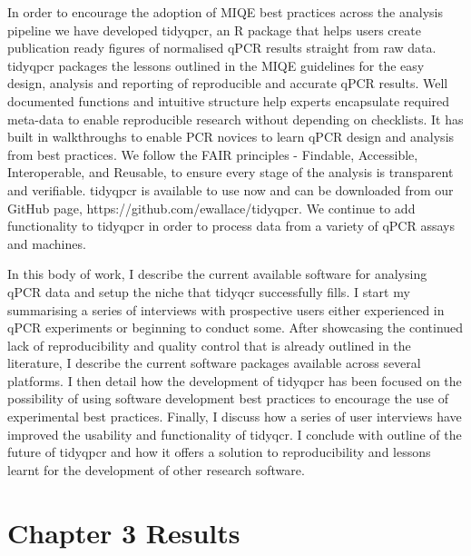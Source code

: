 \documentclass{SBCbookchapter}
\begin{document}
In order to encourage the adoption of MIQE best practices across the analysis pipeline we have developed tidyqpcr, an R package that helps users create publication ready figures of normalised qPCR results straight from raw data. tidyqpcr packages the lessons outlined in the MIQE guidelines for the easy design, analysis and reporting of reproducible and accurate qPCR results. Well documented functions and intuitive structure help experts encapsulate required meta-data to enable reproducible research without depending on checklists. It has built in walkthroughs to enable PCR novices to learn qPCR design and analysis from best practices. We follow the FAIR principles - Findable, Accessible, Interoperable, and Reusable, to ensure every stage of the analysis is transparent and verifiable. tidyqpcr is available to use now and can be downloaded from our GitHub page, https://github.com/ewallace/tidyqpcr. We continue to add functionality to tidyqpcr in order to process data from a variety of qPCR assays and machines.

In this body of work, I describe the current available software for analysing qPCR data and setup the niche that tidyqcr successfully fills. I start my summarising a series of interviews with prospective users either experienced in qPCR experiments or beginning to conduct some. After showcasing the continued lack of reproducibility and quality control that is already outlined in the literature, I describe the current software packages available across several platforms. I then detail how the development of tidyqpcr has been focused on the possibility of using software development best practices to encourage the use of experimental best practices. Finally, I discuss how a series of user interviews have improved the usability and functionality of tidyqcr. I conclude with outline of the future of tidyqpcr and how it offers a solution to reproducibility and lessons learnt for the development of other research software. 

\section{Chapter 3 Results}
\end{document}
